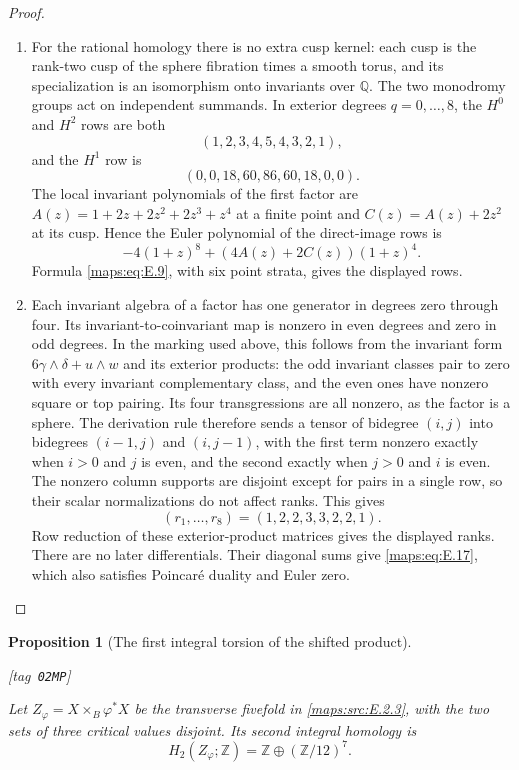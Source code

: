 \documentclass[11pt,a4paper]{article}
\makeatletter
\numberwithin{equation}{section}
\newtheorem{proposition}[proposition]{Proposition}
\theoremstyle{definition}
\newcommand{\StatementRecord}[4]{{\upshape\footnotesize[tag~\texttt{#3}]}\enspace\ignorespaces}
\newcommand{\SeriesRefText}[1]{\ifcsname SRef@#1\endcsname\csname SRef@#1\endcsname\else\textbf{UNRESOLVED}\fi}
\newcommand{\SeriesRef}[1]{\ifmmode\text{\SeriesRefText{#1}}\else\SeriesRefText{#1}\fi}
\makeatother
\begin{document}
\begin{proof}
\begin{enumerate}[label=\arabic*.,leftmargin=*]
\item For the rational homology there is no extra cusp kernel: each
cusp is the rank-two cusp of the sphere fibration times a smooth torus, and its
specialization is an isomorphism onto invariants over $\mathbb Q$.
The two monodromy groups act on independent summands.  In exterior
degrees $q=0,\ldots,8$, the $H^0$ and $H^2$ rows are both
\[
 (1,2,3,4,5,4,3,2,1),
\]
and the $H^1$ row is
\[
 (0,0,18,60,86,60,18,0,0).
\]
The local invariant polynomials of the first factor are
$A(z)=1+2z+2z^2+2z^3+z^4$ at a finite point and
$C(z)=A(z)+2z^2$ at its cusp.  Hence the Euler polynomial of
the direct-image rows is
\[
 -4(1+z)^8+(4A(z)+2C(z))(1+z)^4.
\]
Formula \eqref{maps:eq:E.9}, with six point strata, gives the displayed rows.

\item Each invariant algebra of a factor has one generator in degrees
zero through four.  Its invariant-to-coinvariant map is nonzero
in even degrees and zero in odd degrees.  In the marking used
above, this follows from the invariant form
$6\gamma\wedge\delta+u\wedge w$ and its exterior products:
the odd invariant classes pair to zero with every invariant
complementary class, and the even ones have nonzero square or
top pairing.  Its four transgressions are all nonzero, as the
factor is a sphere.  The derivation rule therefore sends a tensor
of bidegree $(i,j)$ into bidegrees $(i-1,j)$ and $(i,j-1)$,
with the first term nonzero exactly when $i>0$ and $j$ is even,
and the second exactly when $j>0$ and $i$ is even.  The nonzero
column supports are disjoint except for pairs in a single row,
so their scalar normalizations do not affect ranks.  This gives
\[
 (r_1,\ldots,r_8)=(1,2,2,3,3,2,2,1).
\]
Row reduction of these exterior-product matrices gives the displayed ranks.
There are no later differentials.  Their diagonal sums give
\eqref{maps:eq:E.17}, which also satisfies Poincar\'e duality and Euler zero.

\end{enumerate}
\end{proof}





\begin{proposition}[The first integral torsion of the shifted product]\hypertarget{tag-02MP}{}\label{maps:src:E.2.5}
\StatementRecord{maps:src:E.2.5}{proved}{02MP}{\cref{maps:src:E.2.3}, \cref{pub:V:cusp-chern-generators}, \SeriesRef{maps:src:D.1.2}, \eqref{maps:eq:E.I1}, \cref{maps:src:E.1.5}, \eqref{maps:eq:E.20}}


Let \(Z_\varphi=X\times_B\varphi^*X\) be the transverse
fivefold in \ref{maps:src:E.2.3}, with the two sets of three critical values
disjoint. Its second integral homology is
\[
 H_2(Z_\varphi;\mathbb Z)
   =\mathbb Z\oplus(\mathbb Z/12)^7.
\]
\end{proposition}
\end{document}
